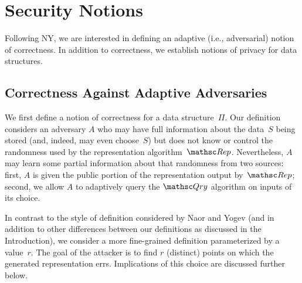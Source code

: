 
\section{Security Notions}
\label{sec:security-notions}
Following NY, we are interested in defining an adaptive (i.e.,
adversarial) notion of correctness.
In addition to correctness, we establish notions of privacy for data structures.





\subsection{Correctness Against Adaptive Adversaries}

We first define a notion of correctness for a data structure~$\Pi$. Our definition
considers an adversary $A$ who may have full information about the data~$S$ being stored (and, indeed,
may even choose~$S$) but does not know or control the randomness used by the representation
algorithm~$\Rep$. Nevertheless, $A$ may learn some partial information about that randomness from
two sources: first, $A$ is given the public portion of the representation output
by~$\Rep$; second, we allow $A$ to adaptively query the $\Qry$ algorithm on inputs
of its choice.

In contrast to the style of definition considered by Naor and Yogev (and in addition
to other differences between our definitions as discussed in the Introduction), we consider
a more fine-grained definition parameterized by a value~$r$. The goal of the attacker
is to find $r$ (distinct) points on which the generated representation errs.
Implications of this choice are discussed further below.

